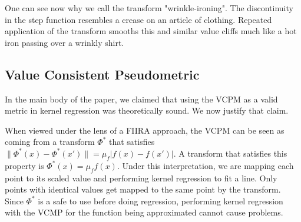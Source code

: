 One can see now why we call the transform "wrinkle-ironing".
The discontinuity in the step function resembles a crease on an article of clothing.
Repeated application of the transform smooths this and similar value cliffs
much like a hot iron passing over a wrinkly shirt.

\subsection{Value Consistent Pseudometric}
In the main body of the paper, we claimed that using the VCPM as a valid
metric in kernel regression was theoretically sound. We now justify that claim.

When viewed under the lens of a FIIRA approach, the VCPM can be seen as coming
from a transform $\Phi^*$ that satisfies $\|\Phi^*(x)- \Phi^*(x')\| = \mu_f |f(x) - f(x')|$.
A transform that satisfies this property is $\Phi^*(x) = \mu_f f(x)$.
Under this interpretation, we are mapping each point to its scaled value
and performing kernel regression to fit a line.
Only points with identical values get mapped to the same point by the transform.
Since $\Phi^*$ is a safe to use before doing regression,
performing kernel regression with the VCMP for the function being approximated
cannot cause problems.

\clearpage
